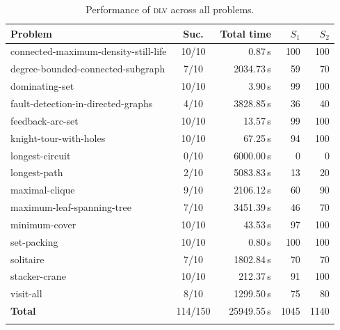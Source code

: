 \begin{table}[htbp]
\centering
\caption{Performance of \textsc{dlv} across all problems.}
\label{tab:performance-dlv}
\begin{tabular}{lcrrr}
\toprule
Problem & Suc. & Total time & $S_1$ & $S_2$ \\
\midrule
connected-maximum-density-still-life & 10/10 & 0.87\,s & 100 & 100 \\
degree-bounded-connected-subgraph & 7/10 & 2034.73\,s & 59 & 70 \\
dominating-set & 10/10 & 3.90\,s & 99 & 100 \\
fault-detection-in-directed-graphs & 4/10 & 3828.85\,s & 36 & 40 \\
feedback-arc-set & 10/10 & 13.57\,s & 99 & 100 \\
knight-tour-with-holes & 10/10 & 67.25\,s & 94 & 100 \\
longest-circuit & 0/10 & 6000.00\,s & 0 & 0 \\
longest-path & 2/10 & 5083.83\,s & 13 & 20 \\
maximal-clique & 9/10 & 2106.12\,s & 60 & 90 \\
maximum-leaf-spanning-tree & 7/10 & 3451.39\,s & 46 & 70 \\
minimum-cover & 10/10 & 43.53\,s & 97 & 100 \\
set-packing & 10/10 & 0.80\,s & 100 & 100 \\
solitaire & 7/10 & 1802.84\,s & 70 & 70 \\
stacker-crane & 10/10 & 212.37\,s & 91 & 100 \\
visit-all & 8/10 & 1299.50\,s & 75 & 80 \\
\midrule
\textbf{Total} & 114/150 & 25949.55\,s & 1045 & 1140 \\
\botrule
\end{tabular}
\end{table}

